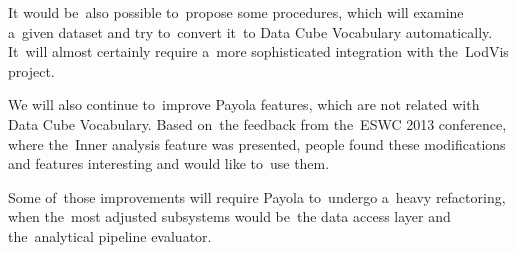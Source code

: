 It would be~also possible to~propose some procedures, which will examine a~given 
dataset and try to~convert it~to Data Cube Vocabulary automatically. It~will 
almost certainly require a~more sophisticated integration with the~LodVis 
project.

We will also continue to~improve Payola features, which are not related with 
Data Cube Vocabulary. Based on~the feedback from the~ESWC 2013 conference, where the~Inner analysis feature was presented, people found these modifications and 
features interesting and would like to~use them.

Some of~those improvements will require Payola to~undergo a~heavy refactoring, 
when the~most adjusted subsystems would be~the data access layer and the~analytical 
pipeline evaluator.

